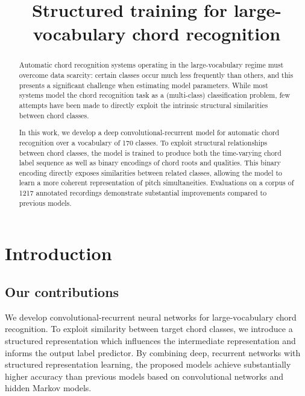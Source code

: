 \documentclass{article}
\title{Structured training for large-vocabulary chord recognition}
\begin{document}
%
\maketitle
%
\begin{abstract}
Automatic chord recognition systems operating in the large-vocabulary regime must overcome data scarcity: certain classes occur much less frequently than others, and this presents a significant challenge when estimating model parameters.
While most systems model the chord recognition task as a (multi-class) classification problem, few attempts have been made to directly exploit the intrinsic structural similarities between chord classes.

In this work, we develop a deep convolutional-recurrent model for automatic chord recognition over a vocabulary of 170 classes.
To exploit structural relationships between chord classes, the model is trained to produce both the time-varying chord label sequence as well as binary encodings of chord roots and qualities.
This binary encoding directly exposes similarities between related classes, allowing the model to learn a more coherent representation of pitch simultaneities.
Evaluations on a corpus of 1217 annotated recordings demonstrate substantial improvements compared to previous models.
\end{abstract}
%
\section{Introduction}\label{sec:introduction}





\subsection{Our contributions}

We develop convolutional-recurrent neural networks for large-vocabulary chord recognition.
To exploit similarity between target chord classes, we introduce a structured representation which influences the intermediate representation and informs the output label predictor.
By combining deep, recurrent networks with structured representation learning, the proposed models achieve substantially higher accuracy than previous models based on convolutional networks and hidden Markov models.
\end{document}
